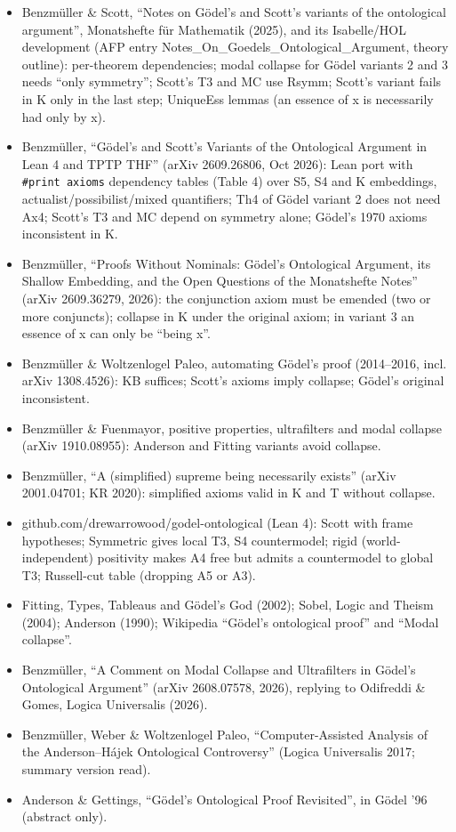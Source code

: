 \documentclass{article}
\begin{document}
\begin{itemize}
\item Benzmüller \& Scott, ``Notes on Gödel's and Scott's variants of the ontological argument'', Monatshefte für Mathematik (2025), and its Isabelle/HOL development (AFP entry Notes\_On\_Goedels\_Ontological\_Argument, theory outline): per-theorem dependencies; modal collapse for Gödel variants 2 and 3 needs ``only symmetry''; Scott's T3 and MC use Rsymm; Scott's variant fails in K only in the last step; UniqueEss lemmas (an essence of x is necessarily had only by x).
\item Benzmüller, ``Gödel's and Scott's Variants of the Ontological Argument in Lean 4 and TPTP THF'' (arXiv 2609.26806, Oct 2026): Lean port with \texttt{\#print axioms} dependency tables (Table 4) over S5, S4 and K embeddings, actualist/possibilist/mixed quantifiers; Th4 of Gödel variant 2 does not need Ax4; Scott's T3 and MC depend on symmetry alone; Gödel's 1970 axioms inconsistent in K.
\item Benzmüller, ``Proofs Without Nominals: Gödel's Ontological Argument, its Shallow Embedding, and the Open Questions of the Monatshefte Notes'' (arXiv 2609.36279, 2026): the conjunction axiom must be emended (two or more conjuncts); collapse in K under the original axiom; in variant 3 an essence of x can only be ``being x''.
\item Benzmüller \& Woltzenlogel Paleo, automating Gödel's proof (2014--2016, incl. arXiv 1308.4526): KB suffices; Scott's axioms imply collapse; Gödel's original inconsistent.
\item Benzmüller \& Fuenmayor, positive properties, ultrafilters and modal collapse (arXiv 1910.08955): Anderson and Fitting variants avoid collapse.
\item Benzmüller, ``A (simplified) supreme being necessarily exists'' (arXiv 2001.04701; KR 2020): simplified axioms valid in K and T without collapse.
\item github.com/drewarrowood/godel-ontological (Lean 4): Scott with frame hypotheses; Symmetric gives local T3, S4 countermodel; rigid (world-independent) positivity makes A4 free but admits a countermodel to global T3; Russell-cut table (dropping A5 or A3).
\item Fitting, Types, Tableaus and Gödel's God (2002); Sobel, Logic and Theism (2004); Anderson (1990); Wikipedia ``Gödel's ontological proof'' and ``Modal collapse''.
\item Benzmüller, ``A Comment on Modal Collapse and Ultrafilters in Gödel's Ontological Argument'' (arXiv 2608.07578, 2026), replying to Odifreddi \& Gomes, Logica Universalis (2026).
\item Benzmüller, Weber \& Woltzenlogel Paleo, ``Computer-Assisted Analysis of the Anderson--Hájek Ontological Controversy'' (Logica Universalis 2017; summary version read).
\item Anderson \& Gettings, ``Gödel's Ontological Proof Revisited'', in Gödel '96 (abstract only).
\end{itemize}
\end{document}
